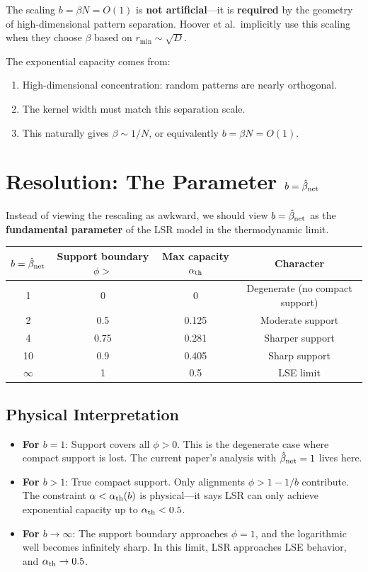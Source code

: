 \documentclass[11pt]{article}
\newcommand{\bhat}{\hat{\beta}_{\rm net}}
\begin{document}
The scaling $b = \beta N = O(1)$ is \textbf{not artificial}---it is \textbf{required} by the geometry of high-dimensional pattern separation. Hoover et al.\ implicitly use this scaling when they choose $\beta$ based on $r_{\min} \sim \sqrt{D}$.

The exponential capacity comes from:
\begin{enumerate}
    \item High-dimensional concentration: random patterns are nearly orthogonal.
    \item The kernel width must match this separation scale.
    \item This naturally gives $\beta \sim 1/N$, or equivalently $b = \beta N = O(1)$.
\end{enumerate}

\section{Resolution: The Parameter $b = \bhat$}

Instead of viewing the rescaling as awkward, we should view $b = \bhat$ as the \textbf{fundamental parameter} of the LSR model in the thermodynamic limit.

\begin{center}
\begin{tabular}{cccc}
\toprule
$b = \bhat$ & Support boundary $\phi > $ & Max capacity $\alpha_{\rm th}$ & Character \\
\midrule
1 & 0 & 0 & Degenerate (no compact support) \\
2 & 0.5 & 0.125 & Moderate support \\
4 & 0.75 & 0.281 & Sharper support \\
10 & 0.9 & 0.405 & Sharp support \\
$\infty$ & 1 & 0.5 & LSE limit \\
\bottomrule
\end{tabular}
\end{center}

\subsection{Physical Interpretation}

\begin{itemize}
    \item \textbf{For $b = 1$}: Support covers all $\phi > 0$. This is the degenerate case where compact support is lost. The current paper's analysis with $\bhat = 1$ lives here.

    \item \textbf{For $b > 1$}: True compact support. Only alignments $\phi > 1 - 1/b$ contribute. The constraint $\alpha < \alpha_{\rm th}(b)$ is physical---it says LSR can only achieve exponential capacity up to $\alpha_{\rm th} < 0.5$.

    \item \textbf{For $b \to \infty$}: The support boundary approaches $\phi = 1$, and the logarithmic well becomes infinitely sharp. In this limit, LSR approaches LSE behavior, and $\alpha_{\rm th} \to 0.5$.
\end{itemize}
\end{document}
